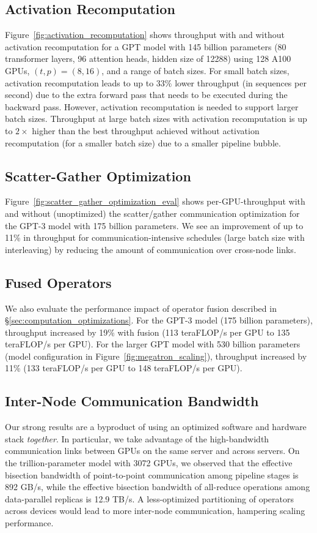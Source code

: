 \subsection{Activation Recomputation}

Figure~\ref{fig:activation_recomputation} shows throughput with and without activation recomputation for a GPT model with 145 billion parameters (80 transformer layers, 96 attention heads, hidden size of 12288) using 128 A100 GPUs, $(t, p) = (8, 16)$, and a range of batch sizes. For small batch sizes, activation recomputation leads to up to $33\%$ lower throughput (in sequences per second) due to the extra forward pass that needs to be executed during the backward pass. However, activation recomputation is needed to support larger batch sizes. Throughput at large batch sizes with activation recomputation is up to $2\times$ higher than the best throughput achieved without activation recomputation (for a smaller batch size) due to a smaller pipeline bubble.

\subsection{Scatter-Gather Optimization}

Figure~\ref{fig:scatter_gather_optimization_eval} shows per-GPU-throughput with and without (unoptimized) the scatter/gather communication optimization for the GPT-3 model with 175 billion parameters. We see an improvement of up to 11\% in throughput for communication-intensive schedules (large batch size with interleaving) by reducing the amount of communication over cross-node links.

\subsection{Fused Operators} We also evaluate the performance impact of operator fusion described in \S\ref{sec:computation_optimizations}. For the GPT-3 model (175 billion parameters), throughput increased by 19\% with fusion (113 teraFLOP/s per GPU to 135 teraFLOP/s per GPU). For the larger GPT model with 530 billion parameters (model configuration in Figure~\ref{fig:megatron_scaling}), throughput increased by 11\% (133 teraFLOP/s per GPU to 148 teraFLOP/s per GPU).

\subsection{Inter-Node Communication Bandwidth} Our strong results are a byproduct of using an optimized software and hardware stack \emph{together}. In particular, we take advantage of the high-bandwidth communication links between GPUs on the same server and across servers. On the trillion-parameter model with 3072 GPUs, we observed that the effective bisection bandwidth of point-to-point communication among pipeline stages is 892 GB/s, while the effective bisection bandwidth of all-reduce operations among data-parallel replicas is 12.9 TB/s. A less-optimized partitioning of operators across devices would lead to more inter-node communication, hampering scaling performance.

